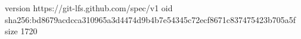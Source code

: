 version https://git-lfs.github.com/spec/v1
oid sha256:bd8679acdcca310965a3d4474d9b4b7e54345c72ecf8671c837475423b705a5f
size 1720
